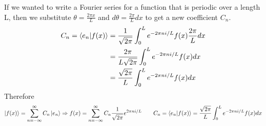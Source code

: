 \documentclass{article}
\newcommand{\be}{\begin{equation}}
\newcommand{\ee}{\end{equation}}
\begin{document}
If we wanted to write a Fourier series for a function that is periodic over a length L, then we substitute $\theta = \frac{2 \pi x}{L}$ and $d\theta = \frac{2 \pi}{L} dx$ to get a new coefficient $C_n$.
\be
  \begin{split}
    C_n = \braket{e_n|f(x)} &= \frac{1}{\sqrt{2 \pi}} \int_0^L e^{- 2 \pi n i / L} f(x) \frac{2 \pi}{L} dx \\
    &= \frac{2 \pi}{L \sqrt{2 \pi}} \int_0^L e^{- 2 \pi n i / L} f(x) dx \\
    &= \frac{\sqrt{2 \pi}}{L} \int_0^L e^{- 2 \pi n i / L} f(x) dx \\
  \end{split}
\ee
Therefore
\be
  \ket{f(x)} = \sum_{n = -\infty}^{\infty} C_n \ket{e_n} \Rightarrow f(x) = \sum_{n = -\infty}^{\infty} C_n \frac{1}{\sqrt{2 \pi}} e^{2 \pi n i / L} \qquad C_n = \braket{e_n|f(x)} = \frac{\sqrt{2 \pi}}{L} \int_0^L e^{- 2 \pi n i / L} f(x) dx
\ee
\end{document}
